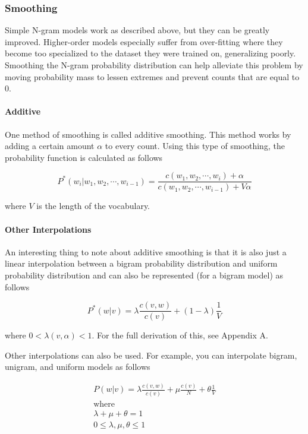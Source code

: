 \documentclass[11pt]{article}
\begin{document}
\subsubsection{Smoothing}

Simple N-gram models work as described above, but they can be greatly improved. Higher-order models especially suffer from over-fitting where they become too specialized to the dataset they were trained on, generalizing poorly. Smoothing the N-gram probability distribution can help alleviate this problem by moving probability mass to lessen extremes and prevent counts that are equal to 0.

\paragraph{Additive}

One method of smoothing is called additive smoothing. This method works by adding a certain amount $\alpha$ to every count. Using this type of smoothing, the probability function is calculated as follows

$$ P^*\left(w_i \vert w_1, w_2, \cdots, w_{i-1} \right) = \frac{ c\left( w_1, w_2, \cdots, w_i \right) + \alpha}{ c\left( w_1, w_2, \cdots, w_{i-1} \right) + V\alpha } $$

where $V$ is the length of the vocabulary.

\paragraph{Other Interpolations}

An interesting thing to note about additive smoothing is that it is also just a linear interpolation between a bigram probability distribution and uniform probability distribution and can also be represented (for a bigram model) as follows

$$ P^*\left( w \vert v \right) = \lambda \frac{c\left( v, w \right)}{c\left( v\right)} + \left( 1 - \lambda \right) \frac{1}{V} $$

where $0 < \lambda\left(v, \alpha\right) < 1$. For the full derivation of this, see Appendix A.

Other interpolations can also be used. For example, you can interpolate bigram, unigram, and uniform models as follows

\begin{gather*}
P\left( w \vert v \right) = \lambda \frac{c \left(v, w\right)}{c \left(v\right)} + \mu \frac{c \left(v\right)}{N} + \theta \frac{1}{V} \\
\text{where} \\
\lambda + \mu + \theta = 1 \\
0 \leq \lambda, \mu, \theta \leq 1
\end{gather*}
\end{document}
